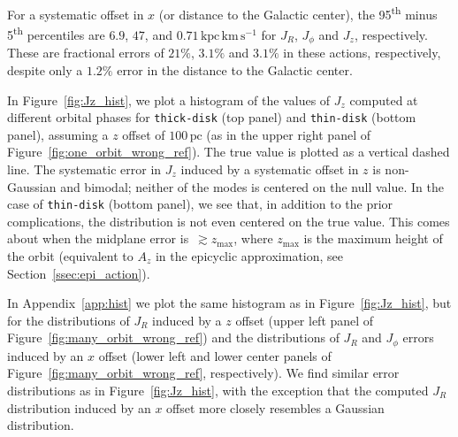 \documentclass[twocolumn]{aastex62}
\newcommand{\pc}{\text{pc}}
\newcommand{\kms}{\text{km}\,\text{s}^{-1}}
\newcommand{\actunit}{\text{kpc}\,\kms}
\newcommand{\thin}{\texttt{thin-disk}}
\newcommand{\thick}{\texttt{thick-disk}}
\begin{document}
For a systematic offset in $x$ (or distance to the Galactic center), the
95\textsuperscript{th} minus 5\textsuperscript{th} percentiles are $6.9$,
$47$, and $0.71\,\actunit$ for $J_R$, $J_{\phi}$ and $J_z$, respectively.
These are fractional errors of $21\%$, $3.1\%$ and $3.1\%$ in these actions, respectively, despite only a $1.2\%$ error in the distance to the Galactic center.

In Figure~\ref{fig:Jz_hist}, we plot a histogram of the values of
$J_z$ computed at different orbital phases for \thick{} (top panel) and \thin{} (bottom panel),
assuming a $z$ offset of $100\,\pc$ (as in the upper right panel of
Figure~\ref{fig:one_orbit_wrong_ref}). The true value is plotted as a
vertical dashed line. The systematic error in $J_z$ induced by a
systematic offset in $z$ is non-Gaussian and bimodal; neither of the modes is centered on the null value. In the case of \thin{}
(bottom panel), we see that, in addition to the prior complications, the
distribution is not even centered on the true value. This comes about when the midplane
error is~$\gtrsim z_{\text{max}}$, where $z_{\text{max}}$ is the maximum
height of the orbit (equivalent to $A_z$ in the epicyclic approximation, see
Section~\ref{ssec:epi_action}).

In Appendix~\ref{app:hist} we plot the same histogram as in
Figure~\ref{fig:Jz_hist}, but for the distributions of $J_R$ induced
by a $z$ offset (upper left panel of Figure~\ref{fig:many_orbit_wrong_ref})
and the distributions of $J_R$ and $J_{\phi}$ errors induced by an
$x$ offset (lower left and lower center panels of
Figure~\ref{fig:many_orbit_wrong_ref}, respectively). We find similar error
distributions as in Figure~\ref{fig:Jz_hist}, with the exception that the
computed $J_R$ distribution induced by an $x$ offset more closely resembles a
Gaussian distribution.
\end{document}
